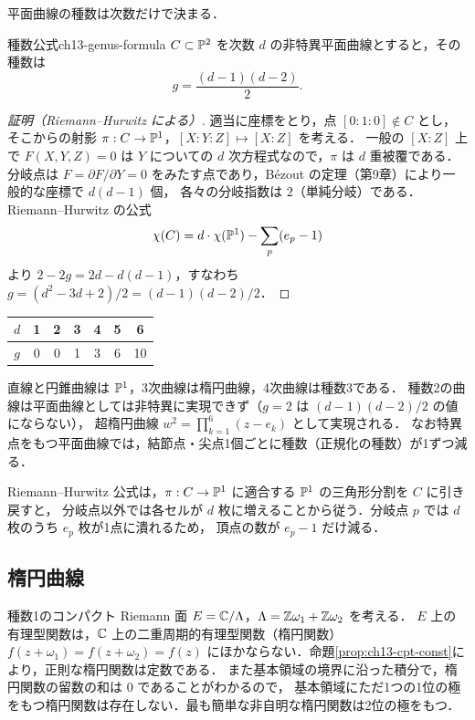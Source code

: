 平面曲線の種数は次数だけで決まる．

\begin{mythm}{種数公式}{ch13-genus-formula}
$C\subset\mathbb{P}^2$ を次数 $d$ の非特異平面曲線とすると，その種数は
\begin{equation}
  g = \frac{(d-1)(d-2)}{2}.
\end{equation}
\end{mythm}

\begin{proof}[証明（Riemann--Hurwitz による）]
適当に座標をとり，点 $[0:1:0]\notin C$ とし，そこからの射影 $\pi:C\to\mathbb{P}^1$，$[X:Y:Z]\mapsto[X:Z]$ を考える．
一般の $[X:Z]$ 上で $F(X,Y,Z)=0$ は $Y$ についての $d$ 次方程式なので，$\pi$ は $d$ 重被覆である．
分岐点は $F=\partial F/\partial Y=0$ をみたす点であり，Bézout の定理（第9章）により一般的な座標で $d(d-1)$ 個，
各々の分岐指数は $2$（単純分岐）である．Riemann--Hurwitz の公式
\begin{equation}
  \chi(C) = d\cdot\chi(\mathbb{P}^1) - \sum_{p}(e_p-1)
\end{equation}
より $2-2g = 2d - d(d-1)$，すなわち $g=(d^2-3d+2)/2=(d-1)(d-2)/2$．
\end{proof}

\begin{center}
\begin{tabular}{c|cccccc}
$d$ & 1 & 2 & 3 & 4 & 5 & 6\\ \hline
$g$ & 0 & 0 & 1 & 3 & 6 & 10
\end{tabular}
\end{center}
直線と円錐曲線は $\mathbb{P}^1$，3次曲線は楕円曲線，4次曲線は種数3である．
種数2の曲線は平面曲線としては非特異に実現できず（$g=2$ は $(d-1)(d-2)/2$ の値にならない），
超楕円曲線 $w^2=\prod_{k=1}^6(z-e_k)$ として実現される．
なお特異点をもつ平面曲線では，結節点・尖点1個ごとに種数（正規化の種数）が1ずつ減る．

\begin{note}
Riemann--Hurwitz 公式は，$\pi:C\to\mathbb{P}^1$ に適合する $\mathbb{P}^1$ の三角形分割を $C$ に引き戻すと，
分岐点以外では各セルが $d$ 枚に増えることから従う．分岐点 $p$ では $d$ 枚のうち $e_p$ 枚が1点に潰れるため，
頂点の数が $e_p-1$ だけ減る．
\end{note}

\subsection{楕円曲線}

種数1のコンパクト Riemann 面 $E=\mathbb{C}/\Lambda$，$\Lambda=\mathbb{Z}\omega_1+\mathbb{Z}\omega_2$ を考える．
$E$ 上の有理型関数は，$\mathbb{C}$ 上の二重周期的有理型関数（楕円関数）
$f(z+\omega_1)=f(z+\omega_2)=f(z)$ にほかならない．命題\ref{prop:ch13-cpt-const}により，正則な楕円関数は定数である．
また基本領域の境界に沿った積分で，楕円関数の留数の和は $0$ であることがわかるので，
基本領域にただ1つの1位の極をもつ楕円関数は存在しない．最も簡単な非自明な楕円関数は2位の極をもつ．

